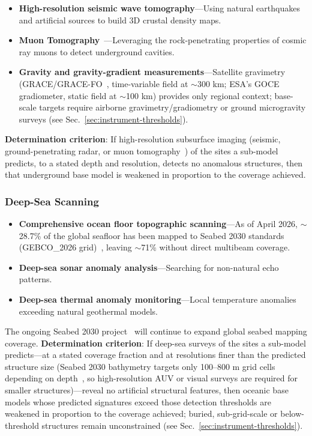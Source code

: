 \documentclass[aps,prd,twocolumn,superscriptaddress,nofootinbib]{revtex4-2}
\begin{document}
\begin{itemize}
  \item \textbf{High-resolution seismic wave tomography}---Using natural earthquakes and artificial sources to build 3D crustal density maps.
  \item \textbf{Muon Tomography}~\cite{Alvarez1970}---Leveraging the rock-penetrating properties of cosmic ray muons to detect underground cavities.
  \item \textbf{Gravity and gravity-gradient measurements}---Satellite gravimetry (GRACE/GRACE-FO~\cite{NASA_GRACEFO}, time-variable field at ${\sim}$300 km; ESA's GOCE gradiometer, static field at ${\sim}$100 km) provides only regional context; base-scale targets require airborne gravimetry/gradiometry or ground microgravity surveys (see Sec.~\ref{sec:instrument-thresholds}).
\end{itemize}

\textbf{Determination criterion}: If high-resolution subsurface imaging (seismic, ground-penetrating radar, or muon tomography~\cite{Alvarez1970}) of the sites a sub-model predicts, to a stated depth and resolution, detects no anomalous structures, then that underground base model is weakened in proportion to the coverage achieved.

\subsubsection{Deep-Sea Scanning}\label{sec:deep-sea}

\begin{itemize}
  \item \textbf{Comprehensive ocean floor topographic scanning}---As of April 2026, ${\sim}$28.7\% of the global seafloor has been mapped to Seabed 2030 standards (GEBCO\_2026 grid)~\cite{Seabed2030,GEBCO2026}, leaving ${\sim}$71\% without direct multibeam coverage.
  \item \textbf{Deep-sea sonar anomaly analysis}---Searching for non-natural echo patterns.
  \item \textbf{Deep-sea thermal anomaly monitoring}---Local temperature anomalies exceeding natural geothermal models.
\end{itemize}

The ongoing Seabed 2030 project~\cite{Seabed2030} will continue to expand global seabed mapping coverage. \textbf{Determination criterion}: If deep-sea surveys of the sites a sub-model predicts---at a stated coverage fraction and at resolutions finer than the predicted structure size (Seabed 2030 bathymetry targets only 100--800 m grid cells depending on depth~\cite{Mayer2018}, so high-resolution AUV or visual surveys are required for smaller structures)---reveal no artificial structural features, then oceanic base models whose predicted signatures exceed those detection thresholds are weakened in proportion to the coverage achieved; buried, sub-grid-scale or below-threshold structures remain unconstrained (see Sec.~\ref{sec:instrument-thresholds}).
\end{document}
